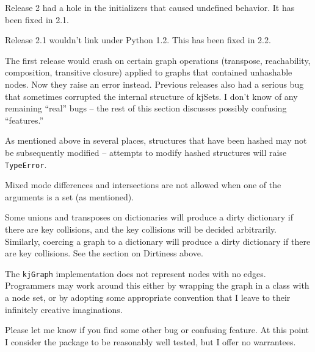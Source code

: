 Release 2 had a hole in the initializers that caused undefined
behavior.  It has been fixed in 2.1.

Release 2.1 wouldn't link under Python 1.2.  This has been
fixed in 2.2.

The first release would crash on certain graph operations
(transpose, reachability, composition, transitive closure)
applied to graphs that contained unhashable nodes.  Now they raise
an error instead.  Previous releases also had a serious bug
that sometimes corrupted the internal structure of kjSets.
I don't know of any remaining ``real'' bugs
-- the rest of this section discusses possibly confusing
``features.''

As mentioned above in several places, structures that have
been hashed may not be subsequently modified -- attempts to modify
hashed structures will raise {\tt TypeError}.

Mixed mode differences and intersections are not allowed when
one of the arguments is a set (as mentioned).

Some unions and transposes on dictionaries will produce a
dirty dictionary if there are key collisions, and the key
collisions will be decided arbitrarily.  Similarly,
coercing a graph to a dictionary will produce a dirty dictionary
if there are key collisions.  See the section on Dirtiness
above.

The {\tt kjGraph} implementation does not represent nodes
with no edges.  Programmers may work around this either by
wrapping the graph in a class with a node set, or by 
adopting some appropriate
convention that I leave to their infinitely creative imaginations.

Please let me know if you find some other bug or confusing
feature.  At this point
I consider the package to be reasonably well tested, but I
offer {\sc no warrantees}.


